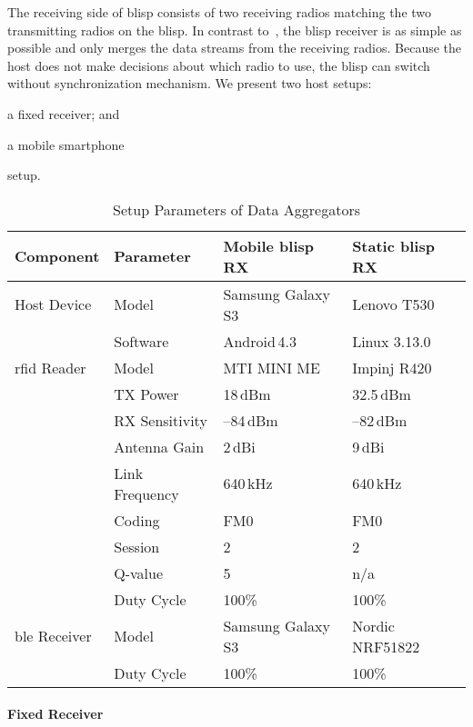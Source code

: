 \documentclass[conference,letterpaper,twoside,final,10pt]{IEEEtran}
\begin{document}
The receiving side of \ac{blisp} consists of two receiving radios matching the two transmitting radios on the \ac{blisp}.
In contrast to~\cite{gummeson2010jsac}, the \ac{blisp} receiver is as simple as possible and only merges the data streams from the receiving radios.
Because the host does not make decisions about which radio to use, the \ac{blisp} can switch without synchronization mechanism.
We present two host setups:
\begin{enumerate*}[label=(\roman*)]
	\item 	a fixed receiver; and
	\item 	a mobile smartphone
\end{enumerate*}
setup.

\begin{table}
	\centering
	\scriptsize
	\caption{Setup Parameters of Data Aggregators}
	\vspace{-2mm}
	\begin{tabularx}{\columnwidth}{llXX}
		\toprule
		Component 			& Parameter 		& Mobile \acs{blisp} RX	& Static \acs{blisp} RX \\
		\midrule
		Host Device 		& Model 			& Samsung Galaxy S3		& Lenovo T530 \\
							& Software		 	& Android\,4.3 			& Linux 3.13.0 \\
		\acs{rfid} Reader 	& Model 			& MTI MINI ME 			& Impinj R420 \\
							& TX Power 			& 18\,\si{dBm}			& 32.5\,\si{dBm} \\
							& RX Sensitivity	& --84\,\si{dBm} 		& --82\,\si{dBm} \\
							& Antenna Gain 		& 2\,\si{dBi}			& 9\,\si{dBi} \\
							& Link Frequency	& 640\,\si{\kilo\hertz} & 640\,\si{\kilo\hertz} \\
							& Coding 			& FM0 					& FM0 \\
							& Session 			& 2 					& 2 \\
							& Q-value 			& 5 					& n/a \\
							& Duty Cycle		& 100\% 				& 100\% \\
		\acs{ble} Receiver 	& Model 			& Samsung Galaxy S3		& Nordic NRF51822 \\
							& Duty Cycle		& 100\% 				& 100\% \\
		\bottomrule
	\end{tabularx}
	\label{tab:mobile_data_aggregator}
\end{table}

\paragraph{Fixed Receiver}
\label{sec:blisp/impinj}
\end{document}
